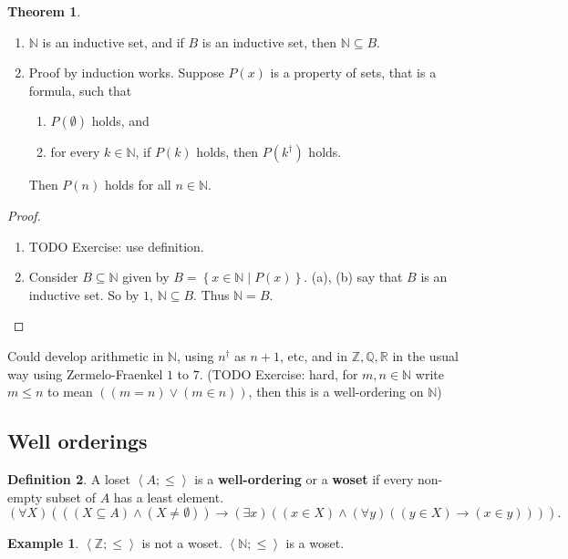 \documentclass{article}
\newcommand{\N}{\mathbb{N}}
\newcommand{\Z}{\mathbb{Z}}
\newcommand{\Q}{\mathbb{Q}}
\newcommand{\R}{\mathbb{R}}
\newcommand{\rb}[1]{\left( #1 \right)}
\newcommand{\cb}[1]{\left\{ #1 \right\}}
\newcommand{\ab}[1]{\left\langle #1 \right\rangle}
\newcommand{\orb}[2]{\rb{#1 \lor #2}}
\newcommand{\andb}[2]{\rb{#1 \land #2}}
\newcommand{\impb}[2]{\rb{#1 \rightarrow #2}}
\newcommand{\fab}[1]{\rb{\forall #1}}
\newcommand{\teb}[1]{\rb{\exists #1}}
\newcommand{\eqb}[2]{\rb{#1 = #2}}
\newcommand{\inb}[2]{\rb{#1 \in #2}}
\newcommand{\subb}[2]{\rb{#1 \subseteq #2}}
\theoremstyle{definition}\newtheorem{definition}{Definition}[subsection]
\theoremstyle{definition}\newtheorem{remark}[definition]{Remark}
\theoremstyle{definition}\newtheorem*{example}{Example}
\theoremstyle{definition}\newtheorem*{note}{Note}
\newtheorem{theorem}[definition]{Theorem}
\begin{document}
\begin{theorem}
\label{thm:3.2.3}
\hfill
\begin{enumerate}
\item $ \N $ is an inductive set, and if $ B $ is an inductive set, then $ \N \subseteq B $.
\item Proof by induction works. Suppose $ P\rb{x} $ is a property of sets, that is a formula, such that
\begin{enumerate}
\item $ P\rb{\emptyset} $ holds, and
\item for every $ k \in \N $, if $ P\rb{k} $ holds, then $ P\rb{k^\dagger} $ holds.
\end{enumerate}
Then $ P\rb{n} $ holds for all $ n \in \N $.
\end{enumerate}
\end{theorem}

\begin{proof}
\hfill
\begin{enumerate}
\item TODO Exercise: use definition.
\item Consider $ B \subseteq \N $ given by $ B = \cb{x \in \N \mid P\rb{x}} $. (a), (b) say that $ B $ is an inductive set. So by $ 1 $, $ \N \subseteq B $. Thus $ \N = B $.
\end{enumerate}
\end{proof}

Could develop arithmetic in $ \N $, using $ n^\dagger $ as $ n + 1 $, etc, and in $ \Z, \Q, \R $ in the usual way using Zermelo-Fraenkel $ 1 $ to $ 7 $. (TODO Exercise: hard, for $ m, n \in \N $ write $ m \le n $ to mean $ \orb{\eqb{m}{n}}{\inb{m}{n}} $, then this is a well-ordering on $ \N $)

\subsection{Well orderings}

\begin{definition}
A loset $ \ab{A; \le} $ is a \textbf{well-ordering} or a \textbf{woset} if every non-empty subset of $ A $ has a least element.
$$ \fab{X}\impb{\andb{\subb{X}{A}}{\rb{X \ne \emptyset}}}{\teb{x}\andb{\inb{x}{X}}{\fab{y}\impb{\inb{y}{X}}{\inb{x}{y}}}}. $$
\end{definition}

\begin{example}
$ \ab{\Z; \le} $ is not a woset. $ \ab{\N; \le} $ is a woset.
\end{example}
\end{document}
